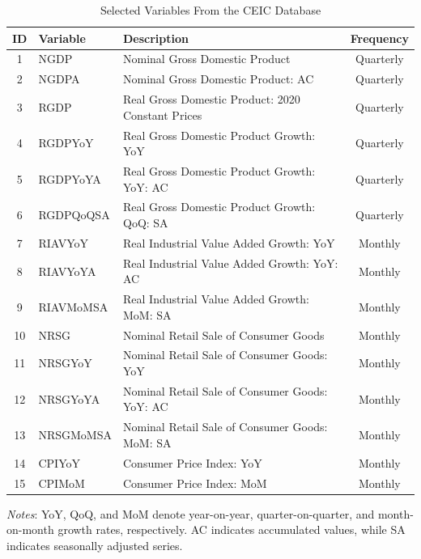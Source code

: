 \documentclass[11pt]{article}
\begin{document}
	\begin{table}[htbp]
		\small
		\centering
		\caption{Selected Variables From the CEIC Database}
		\label{tab:VariablesCN}
		\begin{threeparttable}
			\renewcommand{\arraystretch}{1}
			\begin{tabular}{cllc}
				\toprule
				ID & Variable 	& Description 										& Frequency \\
				\midrule
				1  & NGDP       & Nominal Gross Domestic Product         		    & Quarterly \\
				2  & NGDPA      & Nominal Gross Domestic Product: AC                & Quarterly \\
				3  & RGDP     	& Real Gross Domestic Product: 2020 Constant Prices & Quarterly \\
				4  & RGDPYoY    & Real Gross Domestic Product Growth: YoY           & Quarterly \\
				5  & RGDPYoYA  	& Real Gross Domestic Product Growth: YoY: AC       & Quarterly \\
				6  & RGDPQoQSA  & Real Gross Domestic Product Growth: QoQ: SA	 	& Quarterly \\
				7  & RIAVYoY   	& Real Industrial Value Added Growth: YoY           & Monthly   \\
				8  & RIAVYoYA  	& Real Industrial Value Added Growth: YoY: AC       & Monthly   \\
				9  & RIAVMoMSA  & Real Industrial Value Added Growth: MoM: SA 		& Monthly   \\
				10 & NRSG      	& Nominal Retail Sale of Consumer Goods             & Monthly   \\
				11 & NRSGYoY    & Nominal Retail Sale of Consumer Goods: YoY        & Monthly   \\
				12 & NRSGYoYA   & Nominal Retail Sale of Consumer Goods: YoY: AC    & Monthly   \\
				13 & NRSGMoMSA  & Nominal Retail Sale of Consumer Goods: MoM: SA 	& Monthly   \\
				14 & CPIYoY    	& Consumer Price Index: YoY 						& Monthly   \\
				15 & CPIMoM    	& Consumer Price Index: MoM  						& Monthly   \\
				\bottomrule
			\end{tabular}
			\begin{tablenotes}[flushleft]
				\footnotesize
				\item \textit{Notes}: YoY, QoQ, and MoM denote year-on-year, quarter-on-quarter, and month-on-month growth rates, respectively. AC indicates accumulated values, while SA indicates seasonally adjusted series.
			\end{tablenotes}
		\end{threeparttable}
	\end{table}
\end{document}
